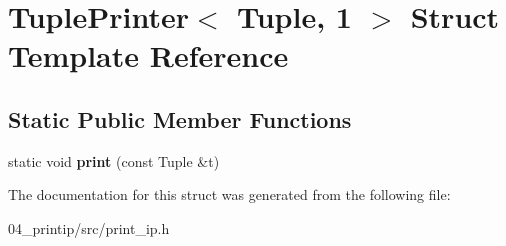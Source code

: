 \hypertarget{structTuplePrinter_3_01Tuple_00_011_01_4}{}\section{Tuple\+Printer$<$ Tuple, 1 $>$ Struct Template Reference}
\label{structTuplePrinter_3_01Tuple_00_011_01_4}
\subsection*{Static Public Member Functions}
\begin{DoxyCompactItemize}
\item 
\mbox{\label{structTuplePrinter_3_01Tuple_00_011_01_4_af4ab0b518a1d2927e949c817aa6b7266}} 
static void {\bfseries print} (const Tuple \&t)
\end{DoxyCompactItemize}


The documentation for this struct was generated from the following file\+:\begin{DoxyCompactItemize}
\item 
04\+\_\+printip/src/print\+\_\+ip.\+h\end{DoxyCompactItemize}
